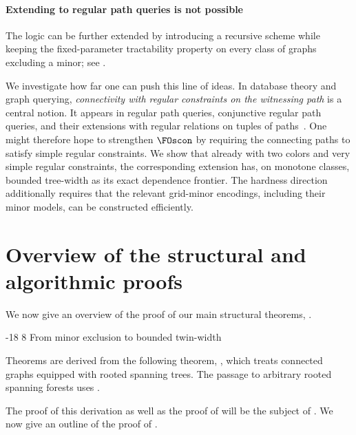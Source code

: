 \documentclass[1p,number,11pt]{elsarticle}
\makeatletter
\renewcommand\subsection{\@startsection{subsection}{2}{\z@}%
  {-18\p@ \@plus -4\p@ \@minus -4\p@}%
  {8\p@ \@plus 4\p@ \@minus 4\p@}%
  {\normalfont\normalsize\bfseries}}
\theoremstyle{plain}
\makeatother
\begin{document}
\medskip 

\paragraph{Extending to regular path queries is not possible}

The logic {\FOscon} can be further extended by introducing a recursive scheme while keeping the fixed-parameter tractability property on every class of graphs excluding a minor; see .

We investigate how far one can push this line of ideas.
In database theory and graph querying, \emph{connectivity with regular constraints on the witnessing path} is a central notion.
It appears in regular path queries, conjunctive regular path queries, and their extensions with regular relations on tuples of paths~\cite{cruz1987,mendelzon1995,barcelo2012,libkin2012,freydenschweik2013,wood2012,salvati2024}.
One might therefore hope to strengthen $\FOscon$ by requiring the connecting paths to satisfy simple regular constraints.
We show that already with two colors and very simple regular constraints,
the corresponding extension has, on monotone classes, bounded tree-width
as its exact dependence frontier. The hardness direction additionally
requires that the relevant grid-minor encodings, including their minor
models, can be constructed efficiently.

\section{Overview of the structural and algorithmic proofs}
\label{sec:outline_struc}

We now give an overview of the proof of our main structural theorems, . 

\subsection{From minor exclusion to bounded twin-width}

Theorems  are derived from the following theorem, , which treats connected graphs equipped with rooted spanning trees.
The passage to arbitrary rooted spanning forests uses .


The proof of this derivation as well as the proof of  will be the subject of . We now give an outline of the proof of . 
\end{document}
